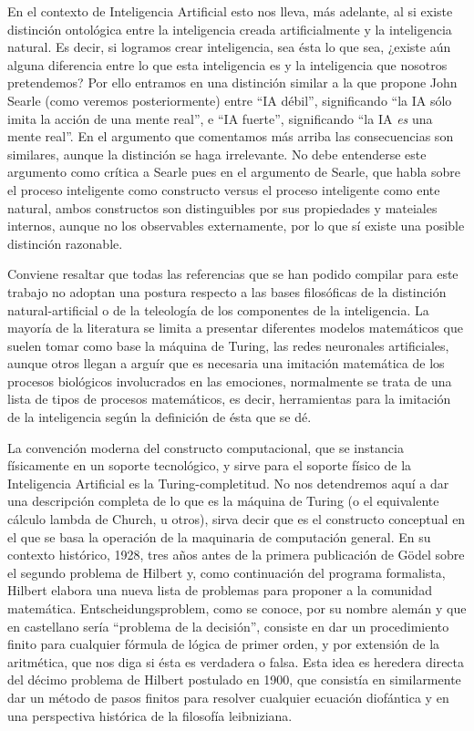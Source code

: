 \documentclass[12pt]{memoir}
\begin{document}
En el contexto de Inteligencia Artificial esto nos lleva, más adelante, al si existe distinción ontológica entre la inteligencia creada artificialmente y la inteligencia natural. Es decir, si logramos crear inteligencia, sea ésta lo que sea, ¿existe aún alguna diferencia entre lo que esta inteligencia es y la inteligencia que nosotros pretendemos? Por ello entramos en una distinción similar a la que propone John Searle (como veremos posteriormente) entre ``IA débil'', significando ``la IA sólo imita la acción de una mente real'', e ``IA fuerte'', significando ``la IA \textit{es} una mente real''. En el argumento que comentamos más arriba las consecuencias son similares, aunque la distinción se haga irrelevante. No debe entenderse este argumento como crítica a Searle pues en el argumento de Searle, que habla sobre el proceso inteligente como constructo versus el proceso inteligente como ente natural, ambos constructos son distinguibles por sus propiedades y mateiales internos, aunque no los observables externamente, por lo que sí existe una posible distinción razonable.

Conviene resaltar que todas las referencias que se han podido compilar para este trabajo no adoptan una postura respecto a las bases filosóficas de la distinción natural-artificial o de la teleología de los componentes de la inteligencia. La mayoría de la literatura se limita a presentar diferentes modelos matemáticos que suelen tomar como base la máquina de Turing, las redes neuronales artificiales, aunque otros llegan a arguír que es necesaria una imitación matemática de los procesos biológicos involucrados en las emociones, normalmente se trata de una lista de tipos de procesos matemáticos, es decir, herramientas para la imitación de la inteligencia según la definición de ésta que se dé.

La convención moderna del constructo computacional, que se instancia físicamente en un soporte tecnológico, y sirve para el soporte físico de la Inteligencia Artificial es la Turing-completitud. No nos detendremos aquí a dar una descripción completa de lo que es la máquina de Turing (o el equivalente cálculo lambda de Church, u otros), sirva decir que es el constructo conceptual en el que se basa la operación de la maquinaria de computación general. En su contexto histórico, 1928, tres años antes de la primera publicación de Gödel sobre el segundo problema de Hilbert y, como continuación del programa formalista, Hilbert elabora una nueva lista de problemas para proponer a la comunidad matemática. Entscheidungsproblem, como se conoce, por su nombre alemán y que en castellano sería ``problema de la decisión'', consiste en dar un procedimiento finito para cualquier fórmula de lógica de primer orden, y por extensión de la aritmética, que nos diga si ésta es verdadera o falsa. Esta idea es heredera directa del décimo problema de Hilbert postulado en 1900, que consistía en similarmente dar un método de pasos finitos para resolver cualquier ecuación diofántica y en una perspectiva histórica de la filosofía leibniziana.
\end{document}
